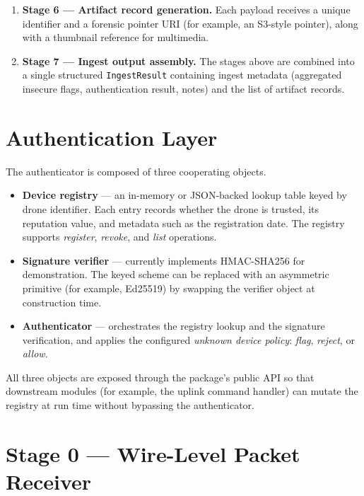 \documentclass[12pt, a4paper]{report}
\begin{document}
\begin{enumerate}
    \item \textbf{Stage 6 --- Artifact record generation.} Each payload
          receives a unique identifier and a forensic pointer URI (for
          example, an S3-style pointer), along with a thumbnail reference
          for multimedia.

    \item \textbf{Stage 7 --- Ingest output assembly.} The stages above
          are combined into a single structured \texttt{IngestResult}
          containing ingest metadata (aggregated insecure flags,
          authentication result, notes) and the list of artifact records.
\end{enumerate}

\section{Authentication Layer}

The authenticator is composed of three cooperating objects.

\begin{itemize}
    \item \textbf{Device registry} --- an in-memory or JSON-backed
          lookup table keyed by drone identifier. Each entry records
          whether the drone is trusted, its reputation value, and
          metadata such as the registration date. The registry supports
          \emph{register}, \emph{revoke}, and \emph{list} operations.
    \item \textbf{Signature verifier} --- currently implements
          HMAC-SHA256 for demonstration. The keyed scheme can be replaced
          with an asymmetric primitive (for example, Ed25519) by
          swapping the verifier object at construction time.
    \item \textbf{Authenticator} --- orchestrates the registry lookup
          and the signature verification, and applies the configured
          \emph{unknown device policy}: \emph{flag}, \emph{reject}, or
          \emph{allow}.
\end{itemize}

All three objects are exposed through the package's public API so that
downstream modules (for example, the uplink command handler) can mutate
the registry at run time without bypassing the authenticator.

\section{Stage 0 --- Wire-Level Packet Receiver}
\end{document}
